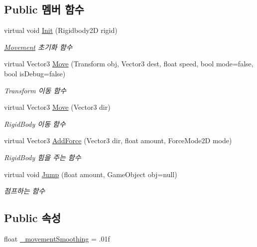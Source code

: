 \subsection*{Public 멤버 함수}
\begin{DoxyCompactItemize}
\item 
virtual void \mbox{\hyperlink{class_movement_a1c50c07edbe274e1cf55253e87506684}{Init}} (Rigidbody2D rigid)
\begin{DoxyCompactList}\small\item\em \mbox{\hyperlink{class_movement}{Movement}} 초기화 함수 \end{DoxyCompactList}\item 
virtual Vector3 \mbox{\hyperlink{class_movement_ad400f155e0556a5e22a74cb77858460a}{Move}} (Transform obj, Vector3 dest, float speed, bool mode=false, bool is\+Debug=false)
\begin{DoxyCompactList}\small\item\em Transform 이동 함수 \end{DoxyCompactList}\item 
virtual Vector3 \mbox{\hyperlink{class_movement_a0a304da685db92346b7e274c2b0f023e}{Move}} (Vector3 dir)
\begin{DoxyCompactList}\small\item\em Rigid\+Body 이동 함수 \end{DoxyCompactList}\item 
virtual Vector3 \mbox{\hyperlink{class_movement_a132e2f7bc0af811ff3b1ab86c8d1f090}{Add\+Force}} (Vector3 dir, float amount, Force\+Mode2D mode)
\begin{DoxyCompactList}\small\item\em Rigid\+Body 힘을 주는 함수 \end{DoxyCompactList}\item 
virtual void \mbox{\hyperlink{class_movement_a656604a80e3c1b86af6b7ce80932442d}{Jump}} (float amount, Game\+Object obj=null)
\begin{DoxyCompactList}\small\item\em 점프하는 함수 \end{DoxyCompactList}\end{DoxyCompactItemize}
\subsection*{Public 속성}
\begin{DoxyCompactItemize}
\item 
float \mbox{\hyperlink{class_movement_aff7ca49ff5d930ac7345da97a5162e3a}{\+\_\+movement\+Smoothing}} = .\+01f
\end{DoxyCompactItemize}

